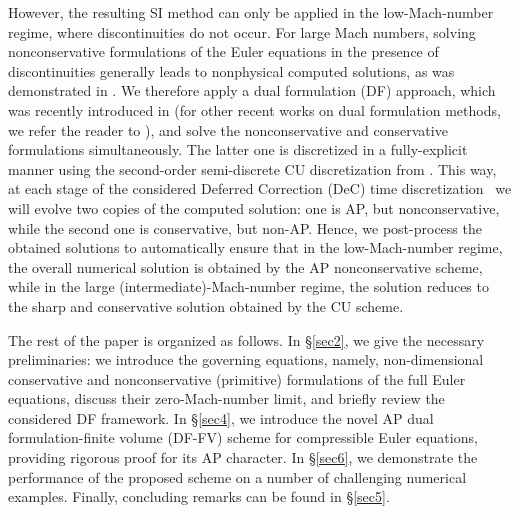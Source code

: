\documentclass[A4paper,12pt,twoside]{article}
\numberwithin{equation}{section}
\numberwithin{figure}{section}
\numberwithin{table}{section}
\newcommand{\lore}[1]{{\leavevmode\color{red} #1}}
\begin{document}
However, the resulting SI method can only be applied in the low-Mach-number regime, where \lore{discontinuities do not occur}. %
\lore{For} large 
Mach numbers, solving \lore{nonconservative formulations} %
of the Euler equations in the presence of discontinuities %
\lore{generally leads}
to nonphysical computed solutions, as was demonstrated in \cite{abgrall2010comment,HouLeF}. We therefore apply a dual
formulation (DF) approach, which was recently introduced in \cite{CFKM} (for other recent works on dual formulation
methods, we refer the reader to \cite{Abg2023,ACKM,AbgLiu,pidatella2019semi}), and solve the nonconservative and conservative formulations simultaneously.
The latter one is discretized \lore{in a fully-explicit manner} using the second-order semi-discrete CU discretization from \cite{KLin}. %
This way, at each \lore{stage of the considered Deferred Correction (DeC) time discretization}~\cite{offner2025analysis} %
we will evolve two copies of the computed solution: one is AP, but
nonconservative, while the second one is conservative, but non-AP. Hence, 
we post-process the obtained solutions to automatically ensure that in the low-Mach-number regime, the overall numerical solution is obtained by the AP
nonconservative scheme, while in the large (intermediate)-Mach-number regime, the solution reduces to the sharp and conservative solution obtained by the CU scheme.

The \lore{rest of the} paper is organized as follows. In \S\ref{sec2}, we give the necessary preliminaries: we introduce the governing equations, namely, non-dimensional conservative and
nonconservative (primitive) formulations of the full Euler equations, discuss their zero-Mach-number limit, and briefly review the
\lore{considered DF framework}. In \S\ref{sec4}, we introduce %
\lore{the} novel AP dual formulation-finite volume (DF-FV) scheme for compressible Euler equations, \lore{providing rigorous proof for its AP character}. In \S\ref{sec6}, we
demonstrate the performance of the \lore{proposed} scheme on a number of challenging numerical examples. Finally, concluding remarks can be found
in \S\ref{sec5}.
\end{document}
